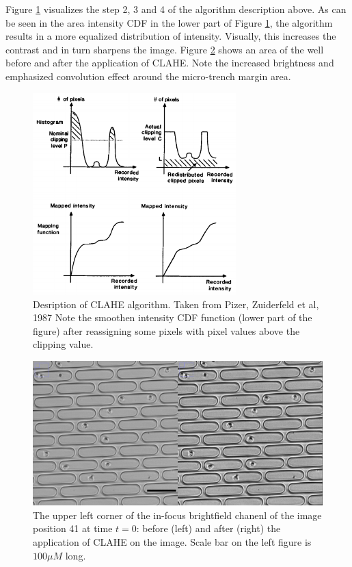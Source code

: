 \documentclass[pdftex,12pt,a4paper]{report}
\begin{document}
Figure \ref{fig:clahe} visualizes the step 2, 3 and 4 of the algorithm description above. As can be seen in the area intensity CDF in the lower part of Figure \ref{fig:clahe}, the algorithm results in a more equalized distribution of intensity. Visually, this increases the contrast and in turn sharpens the image. Figure \ref{fig:clahe_before_after} shows an area of the well before and after the application of CLAHE. Note the increased brightness and emphasized convolution effect around the micro-trench margin area.

\begin{figure}[H]
\centering
\includegraphics[width=0.7\textwidth]{images/clahe}
\caption[Visualizatoin of CLAHE algorithm]{Desription of CLAHE algorithm. Taken from Pizer, Zuiderfeld et al, 1987 \cite{pizer1987adaptive}  Note the  smoothen intensity CDF function (lower part of the figure) after reassigning some pixels with pixel values above the clipping value.}
\label{fig:clahe}
\end{figure}

\begin{figure}[H]
\centering
\includegraphics[width=\textwidth]{images/clahe_before_after}
\caption[Example of application of CLAHE algorithm]{The upper left corner of the in-focus brightfield chanenl of the image position 41 at time $t=0$: before (left) and after (right) the application of CLAHE on the image. Scale bar on the left figure is $100 \mu M$ long.}
\label{fig:clahe_before_after}
\end{figure}
\end{document}
